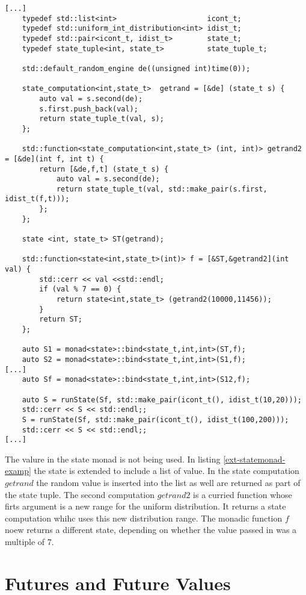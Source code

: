\documentclass[12pt,fleqn]{article}
\begin{document}
\begin{lstlisting}[caption=extended state monad example, label=ext-statemonad-examp]
[...]
	typedef std::list<int>                     icont_t;
	typedef std::uniform_int_distribution<int> idist_t;
	typedef std::pair<icont_t, idist_t>        state_t;
	typedef state_tuple<int, state_t>          state_tuple_t;

	std::default_random_engine de((unsigned int)time(0));

	state_computation<int,state_t>  getrand = [&de] (state_t s) {
		auto val = s.second(de);
		s.first.push_back(val);
		return state_tuple_t(val, s);
 	}; 
	
	std::function<state_computation<int,state_t> (int, int)> getrand2 = [&de](int f, int t) {
		return [&de,f,t] (state_t s) {
			auto val = s.second(de);
			return state_tuple_t(val, std::make_pair(s.first, idist_t(f,t)));
		}; 
	};

	state <int, state_t> ST(getrand);

	std::function<state<int,state_t>(int)> f = [&ST,&getrand2](int val) {
		std::cerr << val <<std::endl; 
		if (val % 7 == 0) {
			return state<int,state_t> (getrand2(10000,11456));
		}
		return ST;
	};

	auto S1 = monad<state>::bind<state_t,int,int>(ST,f);
	auto S2 = monad<state>::bind<state_t,int,int>(S1,f);
[...]
	auto Sf = monad<state>::bind<state_t,int,int>(S12,f);

	auto S = runState(Sf, std::make_pair(icont_t(), idist_t(10,20)));
	std::cerr << S << std::endl;;
	S = runState(Sf, std::make_pair(icont_t(), idist_t(100,200)));
	std::cerr << S << std::endl;;
[...]
\end{lstlisting}

The valure in the state monad is not being used. 
In listing \ref{ext-statemonad-examp} the state is extended to include a list of value.
In the state computation $getrand$ the random value is inserted into the list as well are returned as part of the state tuple.
The second computation $getrand2$ is a curried function whose firts argument is a new range for the uniform distribution.
It returns a state computation whihc uses this new distribution range.
The monadic function $f$ noew returns a different state, depending on whether the value passed in was a multiple of 7.



%
%
\section{Futures and Future Values}
%
%
\end{document}
